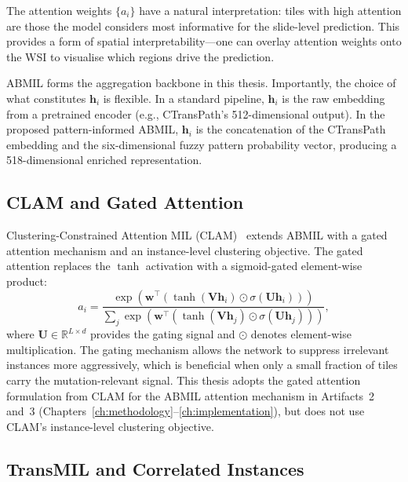 The attention weights $\{a_i\}$ have a natural interpretation: tiles with high attention are those the model considers most informative for the slide-level prediction.
This provides a form of spatial interpretability---one can overlay attention weights onto the WSI to visualise which regions drive the prediction.

ABMIL forms the aggregation backbone in this thesis.
Importantly, the choice of what constitutes $\mathbf{h}_i$ is flexible.
In a standard pipeline, $\mathbf{h}_i$ is the raw embedding from a pretrained encoder (e.g., CTransPath's 512-dimensional output).
In the proposed pattern-informed ABMIL, $\mathbf{h}_i$ is the concatenation of the CTransPath embedding and the six-dimensional fuzzy pattern probability vector, producing a 518-dimensional enriched representation.

\subsection{CLAM and Gated Attention}
\label{sec:bg:clam}

Clustering-Constrained Attention MIL (CLAM)~\cite{lu2021data} extends ABMIL with a gated attention mechanism and an instance-level clustering objective.
The gated attention replaces the $\tanh$ activation with a sigmoid-gated element-wise product:
\begin{equation}
\label{eq:gated_attention}
a_i = \frac{\exp\left(\mathbf{w}^\top \left(\tanh(\mathbf{V} \mathbf{h}_i) \odot \sigma(\mathbf{U} \mathbf{h}_i)\right)\right)}{\sum_{j} \exp\left(\mathbf{w}^\top \left(\tanh(\mathbf{V} \mathbf{h}_j) \odot \sigma(\mathbf{U} \mathbf{h}_j)\right)\right)},
\end{equation}
where $\mathbf{U} \in \mathbb{R}^{L \times d}$ provides the gating signal and $\odot$ denotes element-wise multiplication.
The gating mechanism allows the network to suppress irrelevant instances more aggressively, which is beneficial when only a small fraction of tiles carry the mutation-relevant signal.
This thesis adopts the gated attention formulation from CLAM for the ABMIL attention mechanism in Artifacts~2 and~3 (Chapters~\ref{ch:methodology}--\ref{ch:implementation}), but does not use CLAM's instance-level clustering objective.

\subsection{TransMIL and Correlated Instances}
\label{sec:bg:transmil}

